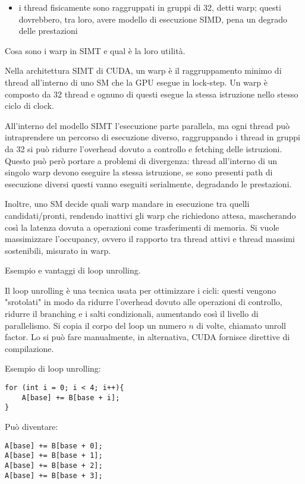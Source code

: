 \begin{questions}
\begin{solution}
\begin{itemize}
    		\item i thread fisicamente sono raggruppati in gruppi di 32, detti warp; questi dovrebbero, tra loro, avere modello di esecuzione SIMD, pena un degrado delle prestazioni 
    	\end{itemize}
    \end{solution}
    
    \question Cosa sono i warp in SIMT e qual è la loro utilità.
    
    \begin{solution}
    	Nella architettura SIMT di CUDA, un warp è il raggruppamento minimo di thread all'interno di uno SM che la GPU esegue in lock-step. Un warp è composto da 32 thread e ognuno di questi esegue la stessa istruzione nello stesso ciclo di clock. 
    	
    	All'interno del modello SIMT l'esecuzione parte parallela, ma ogni thread può intraprendere un percorso di esecuzione diverso, raggruppando i thread in gruppi da 32 si può ridurre l'overhead dovuto a controllo e fetching delle istruzioni. Questo può però portare a problemi di divergenza: thread all'interno di un singolo warp devono eseguire la stessa istruzione, se sono presenti path di esecuzione diversi questi vanno eseguiti serialmente, degradando le prestazioni.
    	
    	Inoltre, uno SM decide quali warp mandare in esecuzione tra quelli candidati/pronti, rendendo inattivi gli warp che richiedono attesa, mascherando così la latenza dovuta a operazioni come trasferimenti di memoria. Si vuole massimizzare l'occupancy, ovvero il rapporto tra thread attivi e thread massimi sostenibili, misurato in warp. 
    \end{solution}
    
    \question Esempio e vantaggi di loop unrolling.
    
    \begin{solution}
    	Il loop unrolling è una tecnica usata per ottimizzare i cicli: questi vengono "srotolati" in modo da ridurre l'overhead dovuto alle operazioni di controllo, ridurre il branching e i salti condizionali, aumentando così il livello di parallelismo. Si copia il corpo del loop un numero $n$ di volte, chiamato unroll factor. Lo si può fare manualmente, in alternativa, CUDA fornisce direttive di compilazione.
    	
    	Esempio di loop unrolling: 
    	\begin{verbatim}
for (int i = 0; i < 4; i++){
	A[base] += B[base + i];
}
    	\end{verbatim}
    	Può diventare:
    	\begin{verbatim}
A[base] += B[base + 0];
A[base] += B[base + 1];
A[base] += B[base + 2];
A[base] += B[base + 3];
    	\end{verbatim}
    	

\end{solution}
\end{questions}
